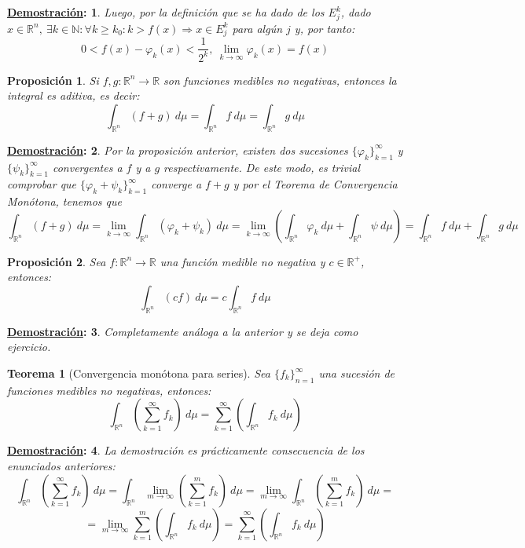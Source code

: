 \documentclass[10pt,a4paper,openright]{book}
\theoremstyle{break}
\newtheorem*{theo}{Teorema}
\newtheorem*{prop}{Proposición}
\newtheorem*{demo}{\underline{Demostración}:}
\newcommand{\dif}[1]{\ d#1}
\begin{document}
\begin{demo}
Luego, por la definición que se ha dado de los $E_j^k$, dado $x \in \mathbb{R}^n,\ \exists k\in \mathbb{N} : \forall k \ge k_0: k > f\left(x\right) \Rightarrow x \in E_j^k$ para algún $j $ y, por tanto:
$$0 < f\left(x \right) - \varphi_k \left(x\right) < \frac{1}{2^k},\ \lim_{k \rightarrow \infty} \varphi_k\left(x\right) = f\left(x\right) $$
\end{demo}

\begin{prop}
Si $f, g: \mathbb{R}^n \rightarrow \mathbb{R}$ son funciones medibles no negativas, entonces la integral es aditiva, es decir:
$$\int_{\mathbb{R}^n} \left(f + g\right) \dif{\mu} = \int_{\mathbb{R}^n} f \dif{\mu} = \int_{\mathbb{R}^n} g \dif{\mu}$$
\end{prop}
\begin{demo}
Por la proposición anterior, existen dos sucesiones $\{\varphi_k\}_{k=1}^\infty$ y $\{\psi_k\}_{k=1}^\infty$ convergentes a $f$ y a $g$ respectivamente. De este modo, es trivial comprobar que $\{\varphi_k + \psi_k\}_{k=1}^\infty$ converge a $f+g$ y por el Teorema de Convergencia Monótona, tenemos que
$$\int_{\mathbb{R}^n}(f+g) \dif{\mu} = \lim_{k\rightarrow\infty} \int_{\mathbb{R}^n}(\varphi_k + \psi_k) \dif{\mu} = \lim_{k \rightarrow \infty} \left( \int_{\mathbb{R}^n} \varphi_k \dif{\mu} + \int_{\mathbb{R}^n} \psi \dif{\mu} \right) = \int_{\mathbb{R}^n} f \dif{\mu} + \int_{\mathbb{R}^n} g \dif{\mu}$$
\end{demo}

\begin{prop}
Sea $f: \mathbb{R}^n \rightarrow \mathbb{R}$ una función medible no negativa y $c\in \mathbb{R}^+$, entonces: 
$$\int_{\mathbb{R}^n} \left(c f\right) \dif{\mu} = c \int_{\mathbb{R}^n}f \dif{\mu}$$
\end{prop}
\begin{demo}
Completamente análoga a la anterior y se deja como ejercicio.
\end{demo}

\begin{theo}[Convergencia monótona para series]
Sea $\{f_k\}_{n=1}^{\infty}$ una sucesión de funciones medibles no negativas, entonces: 
$$\int_{\mathbb{R}^n} \left(\sum_{k=1}^{\infty} f_k \right) \dif{\mu} = \sum_{k=1}^{\infty}\left( \int_{\mathbb{R}^n} f_k \dif{\mu}\right)$$
\end{theo}
\begin{demo}
La demostración es prácticamente consecuencia de los enunciados anteriores:
$$\int_{\mathbb{R}^n} \left(\sum_{k=1}^{\infty} f_k\right) \dif{\mu} = \int_{\mathbb{R}^n} \lim_{m \rightarrow \infty} \left(\sum_{k=1}^{m} f_k \right)\dif{\mu} = \lim_{m \rightarrow \infty}\int_{\mathbb{R}^n} \left(\sum_{k=1}^{m} f_k\right) \dif{\mu} = $$
$$=\lim_{m \rightarrow \infty} \sum_{k=1}^{m} \left(\int_{\mathbb{R}^n} f_k \dif{\mu}\right) = \sum_{k=1}^{\infty} \left(\int_{\mathbb{R}^n} f_k \dif{\mu}\right) $$
\end{demo}
\end{document}
